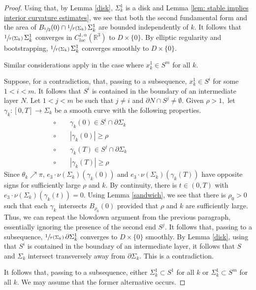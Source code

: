\documentclass[11pt]{amsart}
\begin{document}
\begin{proof}
	 Using that, by Lemma \ref{disk}, $\Sigma^1_k$ is a disk and Lemma \ref{lem: stable implies interior curvature estimates}, we see that both the second fundamental form and the area of $B_{\sfrac12}(0)\cap \sfrac{1}{r(\Sigma_k)}\,\Sigma^1_k$ are bounded independently of $k$. It follows that  $\sfrac{1}{r(\Sigma_k)}\,\Sigma^1_k$ converges  in $C^{1,\alpha}_{loc}(\mathbb{R}^3)$ to $D\times\{0\}$. By elliptic regularity and bootstrapping,  $\sfrac{1}{r(\Sigma_k)}\,\Sigma^1_k$ converges smoothly to $D\times\{0\}$.
	
	Similar considerations apply in the case where $x^{1}_k\in S^m$ for all $k$. 
	
	Suppose, for a contradiction, that, passing to a subsequence, $x^{1}_k\in S^i$ for some $1<i<m$. It follows that $S^i$ is contained in the boundary of an intermediate layer $N$. Let $1<j< m$ be such that $j\neq i$ and $\partial N\cap S^j\neq \emptyset$.  Given $\rho>1,$ let $\gamma_k:[0,T]\to \Sigma_k$ be a smooth curve with the following properties. 
\begin{align*} 
	&\circ\qquad  \text{$\gamma_k(0)\in S^i\cap \partial \Sigma_k$}\hspace{5cm}\\
	&\circ\qquad	\text{$|\gamma_k(0)|\geq \rho$}\\
	&\circ\qquad	\text{$\gamma_k(T)\in S^{j}\cap \partial \Sigma_k$}\\
	&\circ\qquad	\text{$|\gamma_k(T)|\geq \rho$}
\end{align*} 
	 Since $\theta_k\nearrow  \pi$,  $e_3\cdot\nu(\Sigma_k)(\gamma_k(0))$ and $e_3\cdot \nu(\Sigma_k)(\gamma_k(T))$ have opposite signs for sufficiently large $\rho$ and $k$. By continuity, there is $t\in(0,T)$ with $e_3\cdot \nu(\Sigma_k)(\gamma_k(t))=0$. Using Lemma \ref{sandwich}, we see that there is $\rho_0>0$  such that each $\gamma_k$ intersects $B_{\rho_0}(0)$ provided that $\rho$ and $k$ are sufficiently large. Thus, we can repeat the blowdown argument from the previous paragraph, essentially ignoring the presence of the second end $S^j$. It follows that, passing to a subsequence, $\sfrac{1}{r(\Sigma_k)}\,\partial \Sigma^1_k$ converges to $D\times\{0\}$ smoothly. By Lemma \ref{disk}, using  that $S^i$ is contained in the boundary of an intermediate layer, it follows that $S$ and $\Sigma_k$ intersect transversely away from $\partial \Sigma_k$. This is a contradiction. 
	 
	 It follows that, passing to a subsequence, either $\Sigma^1_k\subset S^1$ for all $k$ or $\Sigma^1_k\subset S^m$ for all $k$. We may assume that the former alternative occurs.
	 

\end{proof}
\end{document}
